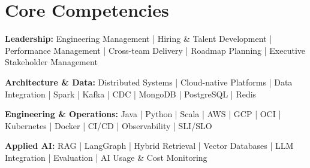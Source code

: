 \section{Core Competencies}
{\small
\textbf{Leadership:} Engineering Management | Hiring \& Talent Development | Performance Management | Cross-team Delivery | Roadmap Planning | Executive Stakeholder Management\par
\textbf{Architecture \& Data:} Distributed Systems | Cloud-native Platforms | Data Integration | Spark | Kafka | CDC | MongoDB | PostgreSQL | Redis\par
\textbf{Engineering \& Operations:} Java | Python | Scala | AWS | GCP | OCI | Kubernetes | Docker | CI/CD | Observability | SLI/SLO\par
\textbf{Applied AI:} RAG | LangGraph | Hybrid Retrieval | Vector Databases | LLM Integration | Evaluation | AI Usage \& Cost Monitoring\par}
